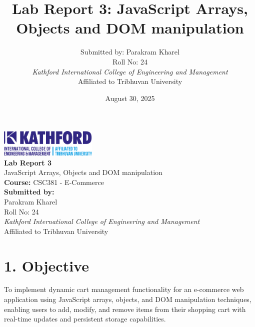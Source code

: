 \documentclass[a4paper,12pt]{article}
\title{Lab Report 3: JavaScript Arrays, Objects and DOM manipulation}
\author{Submitted by: Parakram Kharel \\ Roll No: 24 \\ 
\textit{Kathford International College of Engineering and Management} \\ 
Affiliated to Tribhuvan University}
\begin{document}

\begin{titlepage}
  \begin{center}
    \vspace*{2cm}
    \includegraphics[width=0.35\textwidth]{Kath.png} \\[2cm]

    {\Huge \bfseries Lab Report 3} \\[0.5cm]
    {\Large JavaScript Arrays, Objects and DOM manipulation} \\[2cm]

    {\Large \textbf{Course:} CSC381 - E-Commerce} \\[1cm]
    {\Large \textbf{Submitted by:}} \\[0.3cm]
    {\large Parakram Kharel \\ Roll No: 24} \\[2cm]

    \textit{Kathford International College of Engineering and Management} \\
    Affiliated to Tribhuvan University \\[3cm]

    \date{August 30, 2025}
    {\normalsize \@date}
  \end{center}
\end{titlepage}

\pagestyle{main}
\setlength{\parskip}{1em}

\section*{1. Objective}
To implement dynamic cart management functionality for an e-commerce web application using JavaScript arrays, objects, and DOM manipulation techniques, enabling users to add, modify, and remove items from their shopping cart with real-time updates and persistent storage capabilities.
\end{document}
